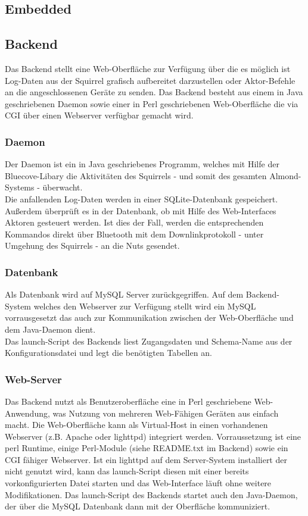 \documentclass[12pt,a4paper]{article}
\begin{document}
\subsection{Embedded}
\subsection{Backend}
Das Backend stellt eine Web-Oberfläche zur Verfügung über die es möglich ist Log-Daten aus der Squirrel grafisch aufbereitet darzustellen oder Aktor-Befehle an die angeschlossenen Geräte zu senden. Das Backend besteht aus einem in Java geschriebenen Daemon sowie einer in Perl geschriebenen Web-Oberfläche die via CGI über einen Webserver verfügbar gemacht wird.

\subsubsection{Daemon}
Der Daemon ist ein in Java geschriebenes Programm, welches mit Hilfe der Bluecove-Libary die Aktivitäten des Squirrels - und somit des gesamten Almond-Systems - überwacht.\\
Die anfallenden Log-Daten werden in einer SQLite-Datenbank gespeichert.\\
Außerdem überprüft es in der Datenbank, ob mit Hilfe des Web-Interfaces Aktoren gesteuert werden. Ist dies der Fall, werden die entsprechenden Kommandos direkt über Bluetooth mit dem Downlinkprotokoll - unter Umgehung des Squirrels - an die Nuts gesendet.\\

\subsubsection{Datenbank}
Als Datenbank wird auf MySQL Server zurückgegriffen. Auf dem Backend-System welches den Webserver zur Verfügung stellt wird ein MySQL vorrausgesetzt das auch zur Kommunikation zwischen der Web-Oberfläche und dem Java-Daemon dient. \\
Das launch-Script des Backends liest Zugangsdaten und Schema-Name aus der Konfigurationsdatei und legt die benötigten Tabellen an.

\subsubsection{Web-Server}
Das Backend nutzt als Benutzeroberfläche eine in Perl geschriebene Web-Anwendung, was Nutzung von mehreren Web-Fähigen Geräten aus einfach macht. Die Web-Oberfläche kann als Virtual-Host in einen vorhandenen Webserver (z.B. Apache oder lighttpd) integriert werden. Vorraussetzung ist eine perl Runtime, einige Perl-Module (siehe README.txt im Backend) sowie ein CGI fähiger Webserver. Ist ein lighttpd auf dem Server-System installiert der nicht genutzt wird, kann das launch-Script diesen mit einer bereits vorkonfigurierten Datei starten und das Web-Interface läuft ohne weitere Modifikationen.
Das launch-Script des Backends startet auch den Java-Daemon, der über die MySQL Datenbank dann mit der Oberfläche kommuniziert.
\end{document}
